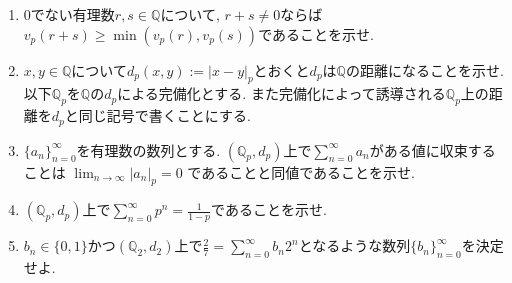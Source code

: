 \documentclass[dvipdfmx,a4paper,11pt]{article}
\newcommand{\Q}{\mathbb{Q}}
\theoremstyle{definition}
\begin{document}
\begin{enumerate}[label=\textbf{問}10.\arabic*]
\begin{enumerate}
\setlength{\parskip}{0cm}
  \setlength{\itemsep}{2pt} 
\item 0でない有理数$r,s \in \Q$について, $r+s \neq 0$ならば$v_{p}(r+s) \ge \min(v_{p}(r), v_{p}(s))$であることを示せ.
\item $x,y \in \Q$について$d_{p}(x,y) :=|x-y|_{p} $とおくと$d_{p}$は$\Q$の距離になることを示せ.
以下$\Q_p$を$\Q$の$d_{p}$による完備化とする. また完備化によって誘導される$\Q_p$上の距離を$d_{p}$と同じ記号で書くことにする.
\item $\{ a_{n}\}_{n=0}^{\infty}$を有理数の数列とする. $(\Q_p,d_{p})$上で$\sum_{n=0}^{\infty} a_n$がある値に収束することは
$\lim_{n \rightarrow \infty}|a_n|_{p} = 0$ であることと同値であることを示せ.
\item $(\Q_p,d_{p})$上で$\sum_{n=0}^{\infty} p^n = \frac{1}{1-p}$であることを示せ. %
\item $b_n \in \{0,1\}$かつ$(\Q_2,d_{2})$上で$\frac{2}{7} = \sum_{n=0}^{\infty} b_n 2^n$となるような数列$\{b_n\}_{n=0}^{\infty}$を決定せよ.
\end{enumerate}





 \end{enumerate}
 
 
 
\end{document}
